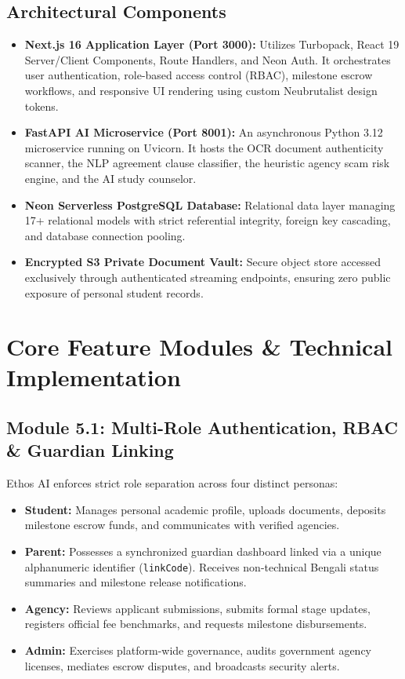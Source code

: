 \documentclass[11pt,a4paper]{article}
\begin{document}
\subsection{Architectural Components}
\begin{itemize}[leftmargin=*]
    \item \textbf{Next.js 16 Application Layer (Port 3000):} Utilizes Turbopack, React 19 Server/Client Components, Route Handlers, and Neon Auth. It orchestrates user authentication, role-based access control (RBAC), milestone escrow workflows, and responsive UI rendering using custom Neubrutalist design tokens.
    \item \textbf{FastAPI AI Microservice (Port 8001):} An asynchronous Python 3.12 microservice running on Uvicorn. It hosts the OCR document authenticity scanner, the NLP agreement clause classifier, the heuristic agency scam risk engine, and the AI study counselor.
    \item \textbf{Neon Serverless PostgreSQL Database:} Relational data layer managing 17+ relational models with strict referential integrity, foreign key cascading, and database connection pooling.
    \item \textbf{Encrypted S3 Private Document Vault:} Secure object store accessed exclusively through authenticated streaming endpoints, ensuring zero public exposure of personal student records.
\end{itemize}

\section{Core Feature Modules \& Technical Implementation}

\subsection{Module 5.1: Multi-Role Authentication, RBAC \& Guardian Linking}
Ethos AI enforces strict role separation across four distinct personas:
\begin{itemize}
    \item \textbf{Student:} Manages personal academic profile, uploads documents, deposits milestone escrow funds, and communicates with verified agencies.
    \item \textbf{Parent:} Possesses a synchronized guardian dashboard linked via a unique alphanumeric identifier (\texttt{linkCode}). Receives non-technical Bengali status summaries and milestone release notifications.
    \item \textbf{Agency:} Reviews applicant submissions, submits formal stage updates, registers official fee benchmarks, and requests milestone disbursements.
    \item \textbf{Admin:} Exercises platform-wide governance, audits government agency licenses, mediates escrow disputes, and broadcasts security alerts.
\end{itemize}
\end{document}
